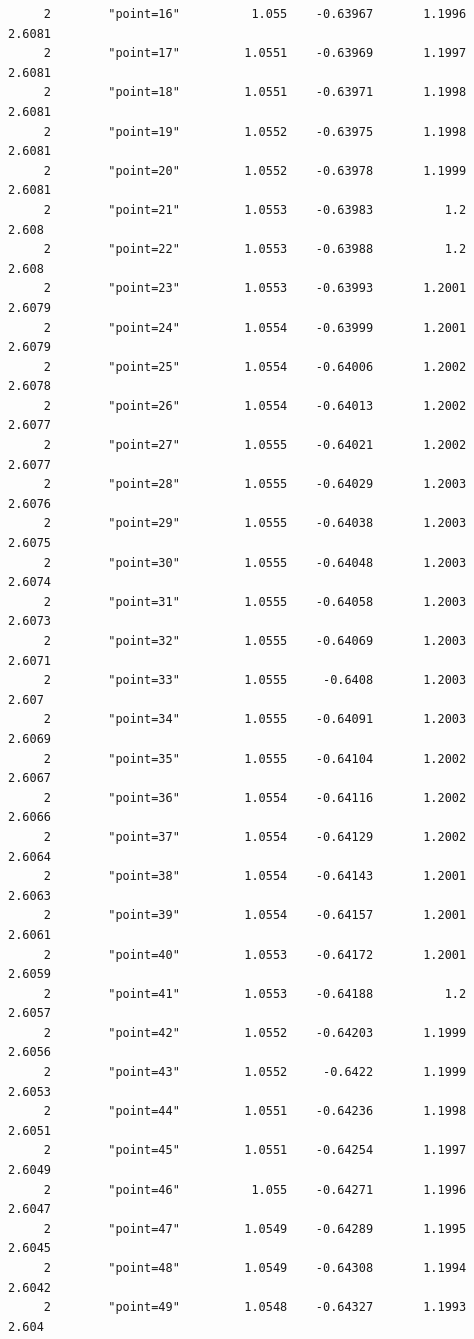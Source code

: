 \documentclass[
]{book}
\begin{document}
\begin{verbatim}
     2        "point=16"          1.055    -0.63967       1.1996      2.6081
     2        "point=17"         1.0551    -0.63969       1.1997      2.6081
     2        "point=18"         1.0551    -0.63971       1.1998      2.6081
     2        "point=19"         1.0552    -0.63975       1.1998      2.6081
     2        "point=20"         1.0552    -0.63978       1.1999      2.6081
     2        "point=21"         1.0553    -0.63983          1.2       2.608
     2        "point=22"         1.0553    -0.63988          1.2       2.608
     2        "point=23"         1.0553    -0.63993       1.2001      2.6079
     2        "point=24"         1.0554    -0.63999       1.2001      2.6079
     2        "point=25"         1.0554    -0.64006       1.2002      2.6078
     2        "point=26"         1.0554    -0.64013       1.2002      2.6077
     2        "point=27"         1.0555    -0.64021       1.2002      2.6077
     2        "point=28"         1.0555    -0.64029       1.2003      2.6076
     2        "point=29"         1.0555    -0.64038       1.2003      2.6075
     2        "point=30"         1.0555    -0.64048       1.2003      2.6074
     2        "point=31"         1.0555    -0.64058       1.2003      2.6073
     2        "point=32"         1.0555    -0.64069       1.2003      2.6071
     2        "point=33"         1.0555     -0.6408       1.2003       2.607
     2        "point=34"         1.0555    -0.64091       1.2003      2.6069
     2        "point=35"         1.0555    -0.64104       1.2002      2.6067
     2        "point=36"         1.0554    -0.64116       1.2002      2.6066
     2        "point=37"         1.0554    -0.64129       1.2002      2.6064
     2        "point=38"         1.0554    -0.64143       1.2001      2.6063
     2        "point=39"         1.0554    -0.64157       1.2001      2.6061
     2        "point=40"         1.0553    -0.64172       1.2001      2.6059
     2        "point=41"         1.0553    -0.64188          1.2      2.6057
     2        "point=42"         1.0552    -0.64203       1.1999      2.6056
     2        "point=43"         1.0552     -0.6422       1.1999      2.6053
     2        "point=44"         1.0551    -0.64236       1.1998      2.6051
     2        "point=45"         1.0551    -0.64254       1.1997      2.6049
     2        "point=46"          1.055    -0.64271       1.1996      2.6047
     2        "point=47"         1.0549    -0.64289       1.1995      2.6045
     2        "point=48"         1.0549    -0.64308       1.1994      2.6042
     2        "point=49"         1.0548    -0.64327       1.1993       2.604

\end{verbatim}
\end{document}
